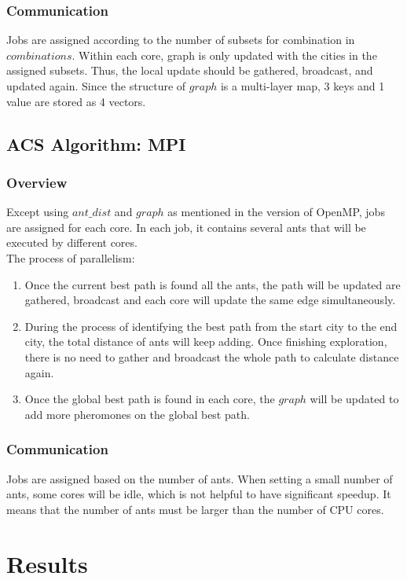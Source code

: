 \documentclass{article}
\begin{document}
\subsubsection{Communication}
    Jobs are assigned according to the number of subsets for combination in $combinations$. Within each core, graph is only updated with the cities in the assigned subsets. Thus, the local update should be gathered, broadcast, and updated again. Since the structure of $graph$ is a multi-layer map, 3 keys and 1 value are stored as 4 vectors.

\subsection{ACS Algorithm: MPI}
\subsubsection{Overview}
    Except using $ant\_dist$ and $graph$ as mentioned in the version of OpenMP, jobs are assigned for each core. In each job, it contains several ants that will be executed by different cores.\\
    The process of parallelism:
    \begin{enumerate}
        \item Once the current best path is found all the ants, the path will be updated are gathered, broadcast and each core will update the same edge simultaneously.
        \item During the process of identifying the best path from the start city to the end city, the total distance of ants will keep adding. Once finishing exploration, there is no need to gather and broadcast the whole path to calculate distance again.
        \item Once the global best path is found in each core, the $graph$ will be updated to add more pheromones on the global best path.
    \end{enumerate}
\subsubsection{Communication}
    Jobs are assigned based on the number of ants. When setting a small number of ants, some cores will be idle, which is not helpful to have significant speedup. It means that the number of ants must be larger than the number of CPU cores.

\section{Results}
\end{document}
